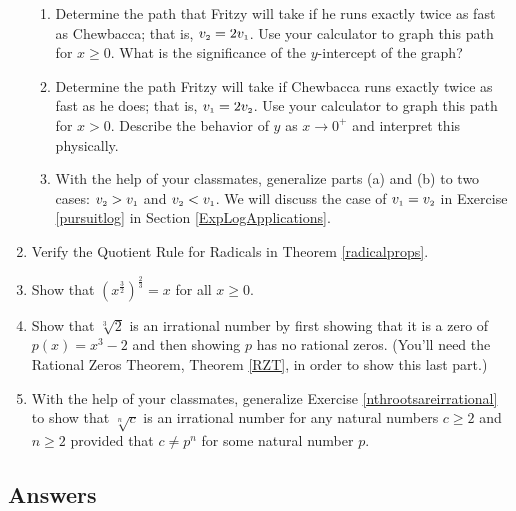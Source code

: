 \begin{enumerate}
\begin{enumerate}
\item  Determine the path that Fritzy will take if he runs exactly twice as fast as Chewbacca;  that is, $v_{\mbox{\tiny$2$}} = 2v_{\mbox{\tiny$1$}}$. Use your calculator to graph this path for $x \geq 0$.  What is the significance of the $y$-intercept of the graph?

\item  Determine the path Fritzy will take if Chewbacca runs exactly twice as fast as he does;  that is, $v_{\mbox{\tiny$1$}} = 2v_{\mbox{\tiny$2$}}$.  Use your calculator to graph this path for $x > 0$.  Describe the behavior of $y$ as $x \rightarrow 0^{+}$ and interpret this physically.

\item  With the help of your classmates, generalize parts (a) and (b) to two cases:  $v_{\mbox{\tiny$2$}} > v_{\mbox{\tiny$1$}}$ and $v_{\mbox{\tiny$2$}} < v_{\mbox{\tiny$1$}}$.   We will discuss the case of $v_{\mbox{\tiny$1$}} = v_{\mbox{\tiny$2$}}$ in Exercise \ref{pursuitlog} in Section \ref{ExpLogApplications}.

\end{enumerate}



\item Verify the Quotient Rule for Radicals in Theorem \ref{radicalprops}.

\item Show that $\left(x^{\frac{3}{2}}\right)^{\frac{2}{3}} = x$ for all $x \geq 0$.

\item Show that $\sqrt[3]{2}$ is an irrational number by first showing that it is a zero of $p(x) = x^{3} - 2$ and then showing $p$ has no rational zeros.  (You'll need the Rational Zeros Theorem, Theorem \ref{RZT}, in order to show this last part.) \label{nthrootsareirrational}

\item With the help of your classmates, generalize Exercise \ref{nthrootsareirrational} to show that $\sqrt[n]{c}$ is an irrational number for any natural numbers $c \geq 2$ and $n \geq 2$ provided that $c \neq p^{n}$ for some natural number $p$.

\end{enumerate}

\newpage

\subsection{Answers}

